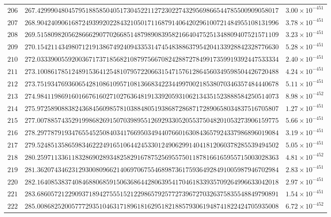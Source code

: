 \documentclass[12pt,reqno]{amsart}
\theoremstyle{remark}
\begin{document}
\begin{longtable}{clc}
$206$ & $267.4299904804579518858504051730452211272302274329569866544785500909058017$ & $3.00\times 10^{-451}$ \\
$207$ & $268.9042409061687249399202284321050171168791406420296100721484955108131996$ & $3.78\times 10^{-451}$ \\
$208$ & $269.5158098205628666290770266851487989083958216640475251348809407521571109$ & $3.23\times 10^{-451}$ \\
$209$ & $270.1542114349807121913867492409433531474548388637954204133928842328776630$ & $5.28\times 10^{-451}$ \\
$210$ & $272.0333900559200367173718568210879756670824288727849917359919392447533334$ & $2.40\times 10^{-451}$ \\
$211$ & $273.1008617851248915364125481079572206631547157612864560349598504426720488$ & $4.24\times 10^{-451}$ \\
$212$ & $273.7519347693606542810861095710813668342234499700218538070346357484440678$ & $5.11\times 10^{-451}$ \\
$213$ & $274.9841198691601667616027102763648191339205931062134351523888584250514073$ & $8.98\times 10^{-452}$ \\
$214$ & $275.9725890883824368456098578103884805193868728687172890658034837516705807$ & $1.27\times 10^{-451}$ \\
$215$ & $277.0078857435291998682691507039895512692933052055375048201053273906159775$ & $5.66\times 10^{-451}$ \\
$216$ & $278.2977879193476554525084034176695034944076601630843657924337986896019084$ & $3.19\times 10^{-451}$ \\
$217$ & $279.5248513586598346222491651064424533012490629914041812060378285539494502$ & $5.05\times 10^{-451}$ \\
$218$ & $280.2597113361183286902893482582916787525695575011878166165955715003028363$ & $4.81\times 10^{-452}$ \\
$219$ & $281.3620743462312930080966214069706755468987361759364928491005987946702984$ & $2.83\times 10^{-451}$ \\
$220$ & $282.1640853837408468806859150636864428063954170461833935709264996633042018$ & $2.97\times 10^{-451}$ \\
$221$ & $283.6860572122909371894275551521229865792577273967270326375835548849790891$ & $1.54\times 10^{-451}$ \\
$222$ & $285.0086825200577729351046317189618162951821885793061948741822424705935008$ & $6.72\times 10^{-452}$ \\

\end{longtable}
\end{document}
